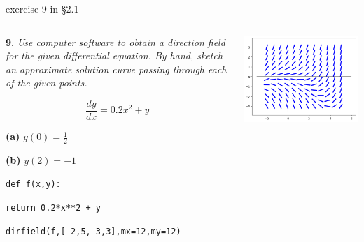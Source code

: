 \documentclass{beamer}
\begin{document}
\begin{frame}{exercise 9 in \S 2.1}

\begin{columns}
\begin{column}{0.45\textwidth}
\small
\noindent \textbf{9}.  \emph{Use computer software to obtain a direction field for the given differential equation.  By hand, sketch an approximate solution curve passing through each of the given points.}

$$\frac{dy}{dx} = 0.2 x^2 + y$$

\noindent \textbf{(a)} \quad $y(0)=\tfrac{1}{2}$

\noindent \textbf{(b)} \quad $y(2)=-1$

\vspace{10mm}

\tiny
\texttt{def f(x,y):}

\hspace{3mm} \texttt{return 0.2*x**2 + y}

\texttt{dirfield(f,[-2,5,-3,3],mx=12,my=12)}
\end{column}
\begin{column}{0.55\textwidth}

\hspace{-10mm} \includegraphics[width=1.15\textwidth]{figs/exercise-9-2-1}
\end{column}
\end{columns}
\end{frame}
\end{document}
